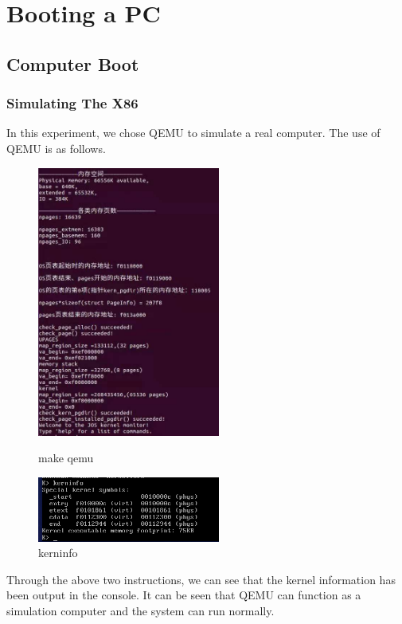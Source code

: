 
\section{Booting a PC}

\subsection{Computer Boot }


\subsubsection{Simulating The X86}
In this experiment, we chose QEMU to simulate a real computer. The use of QEMU is as follows.
\begin{figure}[htbp]
\centering
\begin{minipage}[t]{0.48\textwidth}
\centering
\includegraphics[width=6cm]{figure/make_qemu}
\caption{make qemu}
\end{minipage}
\begin{minipage}[t]{0.48\textwidth}
\centering
\includegraphics[width=6cm]{figure/kerninfo}
\caption{kerninfo}
\end{minipage}
\end{figure}

Through the above two instructions, we can see that the kernel information has been output in the console. It can be seen that QEMU can function as a simulation computer and the system can run normally.
